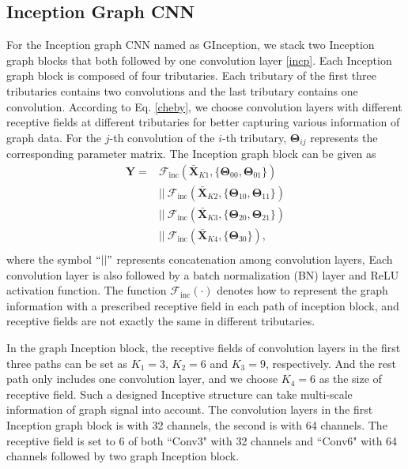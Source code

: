 \documentclass[journal]{IEEEtran}
\begin{document}
\subsection{Inception Graph CNN}
For the Inception graph CNN named as G\underline{\hspace{0.5em}}Inception, we stack two Inception graph blocks that both followed by one convolution layer \ref{incp}.
Each Inception graph block is composed of four tributaries. Each tributary of the first three tributaries contains two convolutions and the last tributary contains one convolution.
According to Eq. \ref{cheby}, we choose convolution layers with different receptive fields at different tributaries for better capturing various information of graph data.
For the $j$-th convolution of the $i$-th tributary, $\mathbf{\Theta}_{ij}$ represents the corresponding parameter matrix. The Inception graph block can be given as
\begin{equation}
\begin{aligned}
\mathbf{Y} = & \mathcal{F}_{\text{inc}}(\mathbf{\bar{X}}_{K1}, \{\mathbf{\Theta}_{00}, \mathbf{\Theta}_{01}\}) \\
    & || \ \mathcal{F}_{\text{inc}}(\mathbf{\bar{X}}_{K2}, \{\mathbf{\Theta}_{10}, \mathbf{\Theta}_{11}\}) \\
    & || \ \mathcal{F}_{\text{inc}}(\mathbf{\bar{X}}_{K3}, \{\mathbf{\Theta}_{20}, \mathbf{\Theta}_{21}\}) \\
    & || \ \mathcal{F}_{\text{inc}}(\mathbf{\bar{X}}_{K4}, \{\mathbf{\Theta}_{30}\}), \\
\end{aligned}
\end{equation}
where the symbol $``||"$ represents concatenation \cite{mix} among convolution layers,
Each convolution layer is also followed by a batch normalization (BN) layer and ReLU activation function.
The function $\mathcal{F}_{\text{inc}}(\cdot)$ denotes how to represent the graph information with a prescribed receptive field in each path of inception block, and receptive fields are not exactly the same in different tributaries.

In the graph Inception block, the receptive fields of convolution layers in the first three paths can be set as $K_1=3$, $K_2=6$ and $K_3=9$, respectively. And the rest path only includes one convolution layer, and we choose $K_4=6$ as the size of receptive field.
Such a designed Inceptive structure can take multi-scale information of graph signal into account. The convolution layers in the first Inception graph block is with 32 channels, the second is with 64 channels. The receptive field is set to 6 of both ``Conv3" with 32 channels and ``Conv6" with 64 channels followed by two graph Inception block.
\end{document}
